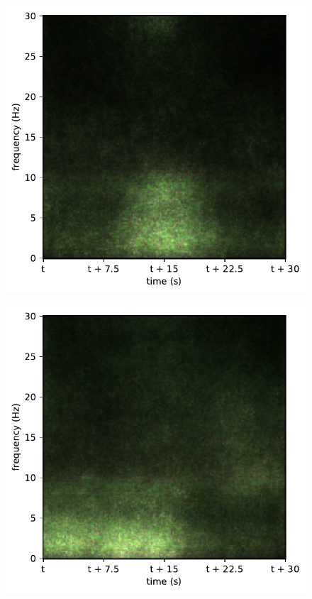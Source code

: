 \begin{subfigure}{.16\textwidth}
  \centering
  \includegraphics[width=1\linewidth]{./../Article/pics/class_rnn_0}
  \caption{}
  \label{fig_1_31}
\end{subfigure}%
\begin{subfigure}{.16\textwidth}
  \centering
  \includegraphics[width=1\linewidth]{./../Article/pics/class_rnn_1}
  \caption{}
  \label{fig_1_32}
\end{subfigure}%
